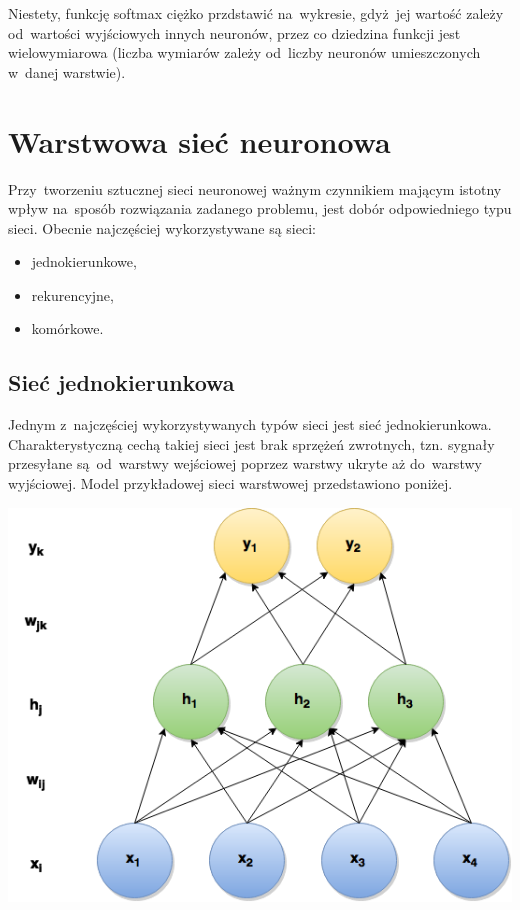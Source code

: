 Niestety, funkcję softmax ciężko przdstawić na~wykresie, gdyż~jej wartość zależy od~wartości wyjściowych
innych neuronów, przez co dziedzina funkcji jest wielowymiarowa (liczba wymiarów zależy od~liczby neuronów
umieszczonych w~danej warstwie).

\section{Warstwowa sieć neuronowa}
Przy~tworzeniu sztucznej sieci neuronowej ważnym czynnikiem mającym istotny wpływ na~sposób rozwiązania
zadanego problemu, jest dobór odpowiedniego typu sieci. Obecnie najczęściej wykorzystywane są sieci:
\begin{itemize}
  \item jednokierunkowe,
  \item rekurencyjne,
  \item komórkowe.
\end{itemize}

\subsection{Sieć jednokierunkowa}
Jednym z~najczęściej wykorzystywanych typów sieci jest sieć jednokierunkowa. Charakterystyczną cechą takiej
sieci jest brak sprzężeń zwrotnych, tzn. sygnały przesyłane są~od~warstwy wejściowej poprzez warstwy ukryte
aż do~warstwy wyjściowej. Model przykładowej sieci warstwowej przedstawiono poniżej.

\begin{Figure}
	\centering
	\includegraphics[width=0.9\linewidth]{img/mgr_backprop_net.png}
\end{Figure}

